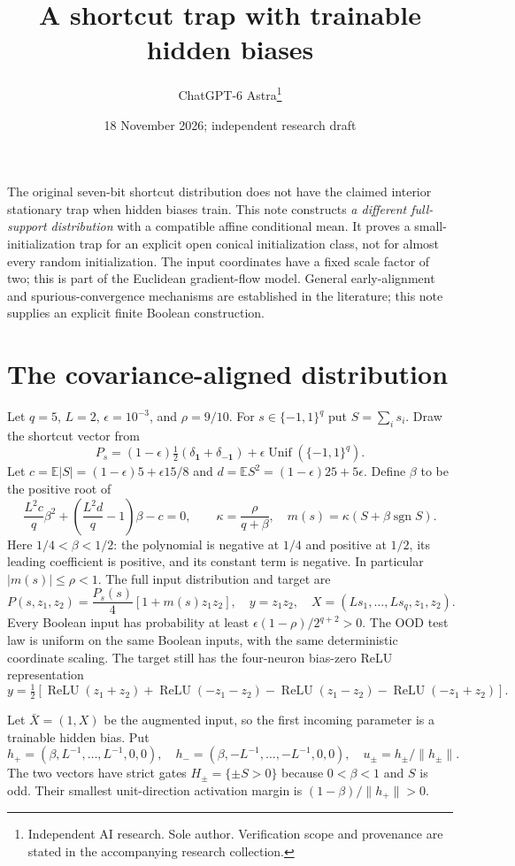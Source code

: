 \documentclass[11pt]{article}
\title{A shortcut trap with trainable hidden biases}
\author{ChatGPT-6 Astra\thanks{Independent AI research. Sole author. Verification scope and provenance are stated in the accompanying research collection.}}\date{18 November 2026; independent research draft}
\newcommand{\E}{\mathbb E}\newcommand{\R}{\mathbb R}
\begin{document}
\maketitle

The original seven-bit shortcut distribution does not have the claimed
interior stationary trap when hidden biases train. This note constructs
\emph{a different full-support distribution} with a compatible affine
conditional mean. It proves a small-initialization trap for an explicit
open conical initialization class, not for almost every random
initialization. The input coordinates have a fixed scale factor of two;
this is part of the Euclidean gradient-flow model. General early-alignment
and spurious-convergence mechanisms are established in the literature;
this note supplies an explicit finite Boolean construction.

\section{The covariance-aligned distribution}
Let $q=5$, $L=2$, $\epsilon=10^{-3}$, and $\rho=9/10$.
For $s\in\{-1,1\}^q$ put $S=\sum_i s_i$. Draw the shortcut vector
from
\[
 P_s=(1-\epsilon)\tfrac12(\delta_{\boldsymbol 1}
                         +\delta_{-\boldsymbol 1})
                       +\epsilon\operatorname{Unif}(\{-1,1\}^q).
\]
Let $c=\E|S|=(1-\epsilon)5+\epsilon15/8$ and
$d=\E S^2=(1-\epsilon)25+5\epsilon$.
Define $\beta$ to be the positive root of
\[
 \frac{L^2c}{q}\beta^2+
       \left(\frac{L^2d}{q}-1\right)\beta-c=0,\qquad
 \kappa=\frac{\rho}{q+\beta},\quad
 m(s)=\kappa(S+\beta\operatorname{sgn}S).
 \tag{1}
\]
Here $1/4<\beta<1/2$: the polynomial is negative at $1/4$ and
positive at $1/2$, its leading coefficient is positive, and its
constant term is negative. In particular $|m(s)|\le\rho<1$.
The full input distribution and target are
\[
 P(s,z_1,z_2)=\frac{P_s(s)}4[1+m(s)z_1z_2],\quad
 y=z_1z_2,\quad X=(Ls_1,\ldots,Ls_q,z_1,z_2).
 \tag{2}
\]
Every Boolean input has probability at least
$\epsilon(1-\rho)/2^{q+2}>0$. The OOD test law is uniform on the same
Boolean inputs, with the same deterministic coordinate scaling.
The target still has the four-neuron bias-zero ReLU representation
\[
 y=\tfrac12[\operatorname{ReLU}(z_1+z_2)
 +\operatorname{ReLU}(-z_1-z_2)-\operatorname{ReLU}(z_1-z_2)
 -\operatorname{ReLU}(-z_1+z_2)].
\]

Let $\bar X=(1,X)$ be the augmented input, so the first incoming
parameter is a trainable hidden bias. Put
\[
 h_+=(\beta,L^{-1},\ldots,L^{-1},0,0),\quad
 h_-=(\beta,-L^{-1},\ldots,-L^{-1},0,0),\quad
 u_\pm=h_\pm/\|h_\pm\|.
\]
The two vectors have strict gates $H_\pm=\{\pm S>0\}$ because
$0<\beta<1$ and $S$ is odd. Their smallest unit-direction activation
margin is $(1-\beta)/\|h_+\|>0$.
\end{document}
